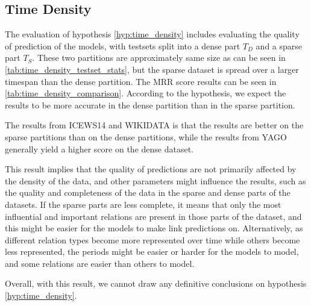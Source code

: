 \subsection{Time Density}
\label{sec:time_density_experiment}




The evaluation of hypothesis \autoref{hyp:time_density} includes evaluating the quality of prediction of the models, with testsets split into a dense part $T_D$ and a sparse part $T_S$. These two partitions are approximately same size as can be seen in \autoref{tab:time_density_testset_stats}, but the sparse dataset is spread over a larger timespan than the dense partition. The MRR score results can be seen in \autoref{tab:time_density_comparison}. According to the hypothesis, we expect the results to be more accurate in the dense partition than in the sparse partition.

The results from ICEWS14 and WIKIDATA is that the results are better on the sparse partitions than on the dense partitions, while the results from YAGO generally yield a higher score on the dense dataset.

This result implies that the quality of predictions are not primarily affected by the density of the data, and other parameters might influence the results, such as the quality and completeness of the data in the sparse and dense parts of the datasets. If the sparse parts are less complete, it means that only the most influential and important relations are present in those parts of the dataset, and this might be easier for the models to make link predictions on. Alternatively, as different relation types become more represented over time while others become less represented, the periods might be easier or harder for the models to model, and some relations are easier than others to model.

Overall, with this result, we cannot draw any definitive conclusions on hypothesis \autoref{hyp:time_density}.

